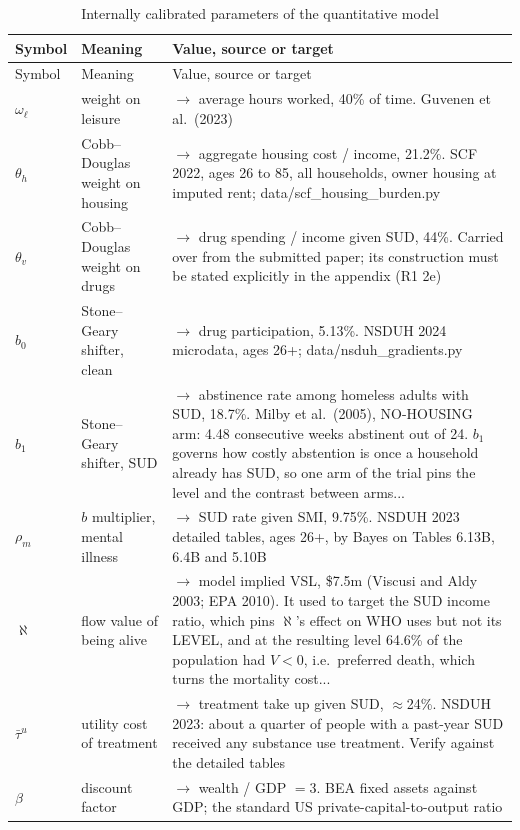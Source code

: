 \scriptsize
\begin{longtable}{@{}lL{3.6cm}L{7.4cm}@{}}
\caption{Internally calibrated parameters of the quantitative model}\label{tab:fint}\\
\toprule
Symbol & Meaning & Value, source or target \\
\midrule
\endfirsthead
\toprule
Symbol & Meaning & Value, source or target \\
\midrule
\endhead
$\omega_{\ell}$ & weight on leisure & $\rightarrow$ average hours worked, 40\% of time. Guvenen et al.\ (2023)  \\
$\theta_h$ & Cobb--Douglas weight on housing & $\rightarrow$ aggregate housing cost / income, 21.2\%. SCF 2022, ages 26 to 85, all households, owner housing at imputed rent; {data/scf\_housing\_burden.py}  \\
$\theta_v$ & Cobb--Douglas weight on drugs & $\rightarrow$ drug spending / income given SUD, 44\%. Carried over from the submitted paper; its construction must be stated explicitly in the appendix (R1 2e)  \\
$b_0$ & Stone--Geary shifter, clean & $\rightarrow$ drug participation, 5.13\%. NSDUH 2024 microdata, ages 26+; {data/nsduh\_gradients.py}  \\
$b_1$ & Stone--Geary shifter, SUD & {$\rightarrow$ abstinence rate among homeless adults with SUD, 18.7\%. Milby et al.\ (2005), NO-HOUSING arm: 4.48 consecutive weeks abstinent out of 24. $b_1$ governs how costly abstention is once a household already has SUD, so one arm of the trial pins the level and the contrast between arms... } \\
$\rho_m$ & $b$ multiplier, mental illness & $\rightarrow$ SUD rate given SMI, 9.75\%. NSDUH 2023 detailed tables, ages 26+, by Bayes on Tables 6.13B, 6.4B and 5.10B  \\
$\aleph$ & flow value of being alive & {$\rightarrow$ {model implied VSL, \$7.5m} (Viscusi and Aldy 2003; EPA 2010). It used to target the SUD income ratio, which pins $\aleph$'s effect on WHO uses but not its LEVEL, and at the resulting level 64.6\% of the population had $V<0$, i.e.\ preferred death, which turns the mortality cost... } \\
$\bar\tau^{u}$ & utility cost of treatment & $\rightarrow$ treatment take up given SUD, $\approx$24\%. NSDUH 2023: about a quarter of people with a past-year SUD received any substance use treatment. {Verify against the detailed tables}  \\
$\beta$ & discount factor & $\rightarrow$ wealth / GDP $=3$. BEA fixed assets against GDP; the standard US private-capital-to-output ratio  \\

\end{longtable}

